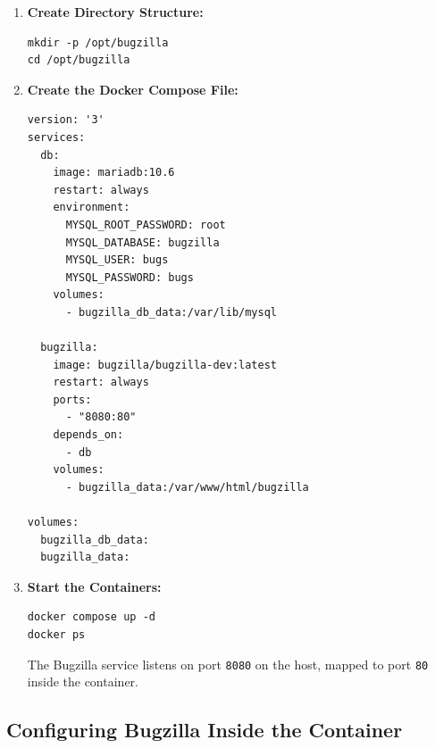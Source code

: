 \begin{enumerate}
    \item \textbf{Create Directory Structure:}

    \begin{verbatim}
mkdir -p /opt/bugzilla
cd /opt/bugzilla
    \end{verbatim}

    \item \textbf{Create the Docker Compose File:}

    \begin{verbatim}
version: '3'
services:
  db:
    image: mariadb:10.6
    restart: always
    environment:
      MYSQL_ROOT_PASSWORD: root
      MYSQL_DATABASE: bugzilla
      MYSQL_USER: bugs
      MYSQL_PASSWORD: bugs
    volumes:
      - bugzilla_db_data:/var/lib/mysql

  bugzilla:
    image: bugzilla/bugzilla-dev:latest
    restart: always
    ports:
      - "8080:80"
    depends_on:
      - db
    volumes:
      - bugzilla_data:/var/www/html/bugzilla

volumes:
  bugzilla_db_data:
  bugzilla_data:
    \end{verbatim}

    \item \textbf{Start the Containers:}

    \begin{verbatim}
docker compose up -d
docker ps
    \end{verbatim}

    The Bugzilla service listens on port \texttt{8080} on the host, mapped to port \texttt{80} inside the container.
\end{enumerate}

\subsection{Configuring Bugzilla Inside the Container}

